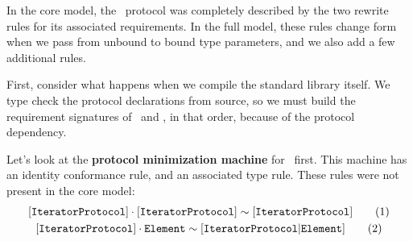 \documentclass[../generics]{subfiles}
\begin{document}
\begin{example}
In the core model, the \tSequence\ protocol was completely described by the two rewrite rules for its associated requirements. In the full model, these rules change form when we pass from unbound to bound type parameters, and we also add a few additional rules.

First, consider what happens when we compile the standard library itself. We type check the protocol declarations from source, so we must build the requirement signatures of \tIterator\ and \tSequence, in that order, because of the protocol dependency.

Let's look at the \textbf{protocol minimization machine} for \tIterator\ first. This machine has an identity conformance rule, and an associated type rule. These rules were not present in the core model:
\begin{gather*}
\ConfRule{\pIterator}{\pIterator} \tag{1}\\
\AssocRule{IteratorProtocol}{Element} \tag{2}
\end{gather*}


\end{example}
\end{document}
